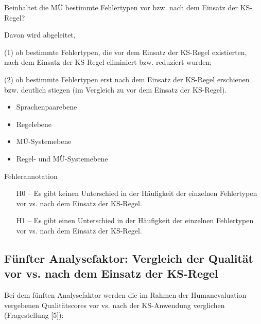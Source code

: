 \begin{description}[font=\normalfont\bfseries]
\item [Fragestellung] Beinhaltet die MÜ bestimmte Fehlertypen vor bzw. nach dem Einsatz der KS-Regel?

Davon wird abgeleitet,

(1) ob bestimmte Fehlertypen, die vor dem Einsatz der KS-Regel existierten, nach dem Einsatz der KS-Regel eliminiert bzw. reduziert wurden;

(2) ob bestimmte Fehlertypen erst nach dem Einsatz der KS-Regel erschienen bzw. deutlich stiegen (im Vergleich zu vor dem Einsatz der KS-Regel).
\item [Analyseebene]\hfill
  \begin{itemize}
  \item Sprachenpaarebene
  \item Regelebene
  \item MÜ-Systemebene
  \item Regel- und MÜ-Systemebene
  \end{itemize}
\item [Analysemethode] Fehlerannotation
\item [Hypothesen]\hfill
  \begin{itemize}
  \item [H0] -- Es gibt keinen Unterschied in der Häufigkeit der einzelnen Fehlertypen vor vs. nach dem Einsatz der KS-Regel.
  \item [H1] -- Es gibt einen Unterschied in der Häufigkeit der einzelnen Fehlertypen vor vs. nach dem Einsatz der KS-Regel.
  \end{itemize}
\end{description}


\subsection*{Fünfter Analysefaktor: Vergleich der Qualität vor vs. nach dem Einsatz der KS-Regel}

Bei dem fünften Analysefaktor werden die im Rahmen der Humanevaluation vergebenen Qualitätscores vor vs. nach der KS-Anwendung verglichen (Fragestellung [5]):

